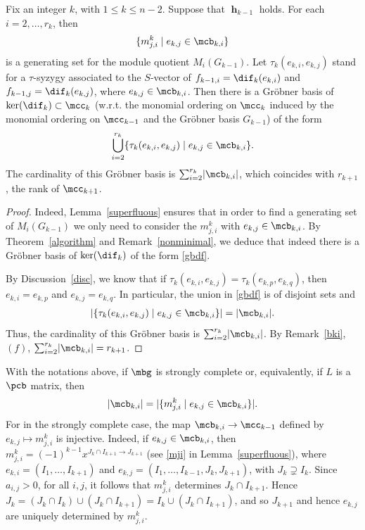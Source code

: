 \begin{proposition}\label{gbdesiredform}
Fix an integer $k$, with $1\leq k\leq n-2$. Suppose that $\mbfh_{k-1}$
holds. For each $i=2,\ldots ,r_k$, then
\begin{eqnarray*}
\{ m^k_{j,i}\mid e_{k,j}\in\mcb_{k,i}\}
\end{eqnarray*}
is a generating set for the module quotient $M_i(G_{k-1})$. Let
$\tau_k(e_{k,i},e_{k,j})$ stand for a $\tau$-syzygy associated to the
$S$-vector of $f_{k-1,i}=\dif_k(e_{k,i})$ and
$f_{k-1,j}=\dif_k(e_{k,j})$, where $e_{k,j}\in\mcb_{k,i}$. Then there
is a Gr\"obner basis of $\ker(\dif_k)\subset\mcc_k$ (w.r.t. the
monomial ordering on $\mcc_k$ induced by the monomial ordering on
$\mcc_{k-1}$ and the Gr\"obner basis $G_{k-1}$) of the form
\begin{eqnarray}\label{gbdf}
\bigcup_{i=2}^{r_k}\{\tau_{k}(e_{k,i},e_{k,j})\mid
e_{k,j}\in\mcb_{k,i}\}.
\end{eqnarray}
The cardinality of this Gr\"obner basis is
$\sum_{i=2}^{r_k}\lvert\mcb_{k,i}\rvert$, which coincides with
$r_{k+1}$, the rank of $\mcc_{k+1}$.
\end{proposition}
\begin{proof}
Indeed, Lemma~\ref{superfluous} ensures that in order to find a
generating set of $M_i(G_{k-1})$ we only need to consider the
$m^{k}_{j,i}$ with $e_{k,j}\in\mcb_{k,i}$. By Theorem~\ref{algorithm}
and Remark~\ref{nonminimal}, we deduce that indeed there is a Gr\"obner
basis of $\ker(\dif_k)$ of the form \eqref{gbdf}.

By Discussion~\ref{disc}, we know that if
$\tau_{k}(e_{k,i},e_{k,j})=\tau_k(e_{k,p},e_{k,q})$, then
$e_{k,i}=e_{k,p}$ and $e_{k,j}=e_{k,q}$. In particular, the union in
\eqref{gbdf} is of disjoint sets and
\begin{eqnarray*}
\lvert\{\tau_k(e_{k,i},e_{k,j})\mid
e_{k,j}\in\mcb_{k,i}\}\rvert=\lvert\mcb_{k,i}\rvert. 
\end{eqnarray*}
Thus, the cardinality of this Gr\"obner basis is
$\sum_{i=2}^{r_k}\lvert\mcb_{k,i}\rvert$. By Remark~\ref{bki}, $(f)$,
$\sum_{i=2}^{r_k}\lvert\mcb_{k,i}\rvert=r_{k+1}$.
\end{proof}

\begin{remark}\label{min-m}
With the notations above, if $\mbg$ is strongly complete or,
equivalently, if $L$ is a $\pcb$ matrix, then
\begin{eqnarray*}
\vert\mcb_{k,i}\rvert=
\lvert \{ m^k_{j,i}\mid e_{k,j}\in\mcb_{k,i}\}\rvert.
\end{eqnarray*}
For in the strongly complete case, the map $\mcb_{k,i}\to\mcc_{k-1}$
defined by $e_{k,j}\mapsto m^{k}_{j,i}$ is injective. Indeed, if
$e_{k,j}\in\mcb_{k,i}$, then $m^k_{j,i}=(-1)^{k-1}x^{J_{k}\cap
  I_{k+1}\to J_{k+1}}$ (see \eqref{mji} in Lemma~\ref{superfluous}),
where $e_{k,i}=(I_1,\ldots ,I_{k+1})$ and $e_{k,j}=(I_1,\ldots,
I_{k-1},J_k,J_{k+1})$, with $J_k\supsetneq I_k$. Since $a_{i,j}>0$,
for all $i,j$, it follows that $m^k_{j,i}$ determines $J_k\cap
I_{k+1}$. Hence $J_k=(J_k\cap I_k)\cup (J_k\cap I_{k+1})=I_k\cup
(J_k\cap I_{k+1})$, and so $J_{k+1}$ and hence $e_{k,j}$ are uniquely
determined by $m^k_{j,i}$.
\end{remark}

